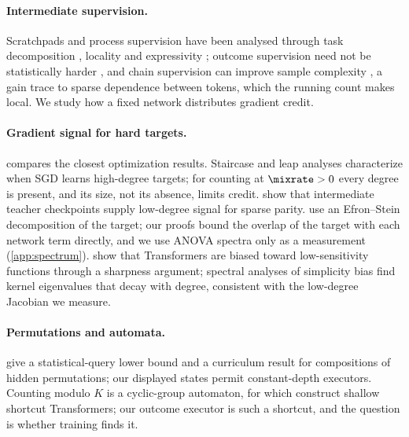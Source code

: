 \paragraph{Intermediate supervision.} Scratchpads and process supervision
\citep{nye2021scratchpads,uesato2022solving,wei2022cot,lightman2023verify} have been analysed through task decomposition
\citep{wies2023subtask}, locality \citep{prystawski2023think,abbe2024globality} and expressivity
\citep{feng2023towards,merrill2024expressive,malach2023autoregressive}; outcome supervision need not be statistically
harder \citep{jia2025verify}, and chain supervision can improve sample complexity
\citep{hanneke2026samplecomplexityautoregressivereasoning,wen2024sparse}, a gain \citet{wen2024sparse} trace to sparse dependence between
tokens, which the running count makes local. We study how a fixed network distributes gradient credit.

\paragraph{Gradient signal for hard targets.}  compares the closest optimization results. Staircase and leap analyses
\citep{abbe2021staircase,abbe2022mergedstaircase,abbe2023sgd} characterize when SGD learns high-degree targets; for counting at
$\mixrate>0$ every degree is present, and its size, not its absence, limits credit. \citet{panigrahi2025progressive} show that intermediate
teacher checkpoints supply low-degree signal for sparse parity. \citet{li2025noise} use an Efron--Stein decomposition of the target; our
proofs bound the overlap of the target with each network term directly, and we use ANOVA spectra only as a measurement
(\cref{app:spectrum}). \citet{hahn2024sensitive} show that Transformers are biased toward low-sensitivity functions through a sharpness
argument; spectral analyses of simplicity bias \citep{yang2019spectral} find kernel eigenvalues that decay with degree, consistent with the
low-degree Jacobian we measure.

\paragraph{Permutations and automata.} \citet{wang2025compositional} give a statistical-query lower bound and a curriculum result for
compositions of hidden permutations; our displayed states permit constant-depth executors. Counting modulo $K$ is a cyclic-group
automaton, for which \citet{liu2023automata} construct shallow shortcut Transformers; our outcome executor is such a shortcut, and the
question is whether training finds it.

